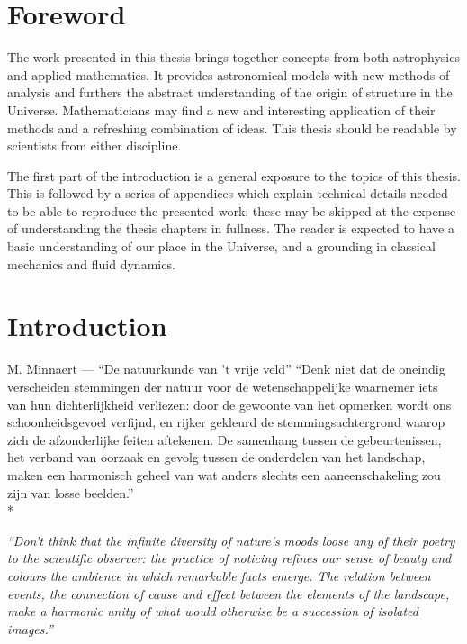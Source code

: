 
\chapter*{Foreword}
The work presented in this thesis brings together concepts from both astrophysics and applied mathematics. It provides astronomical models with new methods of analysis and furthers the abstract understanding of the origin of structure in the Universe. Mathematicians may find a new and interesting application of their methods and a refreshing combination of ideas. This thesis should be readable by scientists from either discipline.

The first part of the introduction is a general exposure to the topics of this thesis. This is followed by a series of appendices which explain technical details needed to be able to reproduce the presented work; these may be skipped at the expense of understanding the thesis chapters in fullness. The reader is expected to have a basic understanding of our place in the Universe, and a grounding in classical mechanics and fluid dynamics.

\chapter{Introduction}
\begin{aquote}{M. Minnaert --- ``De natuurkunde van \'{}t vrije veld''}
    ``Denk niet dat de oneindig verscheiden stemmingen der natuur voor de wetenschappelijke waarnemer iets van hun dichterlijkheid verliezen: door de gewoonte van het opmerken wordt ons schoonheidsgevoel verfijnd, en rijker gekleurd de stemmingsachtergrond waarop zich de afzonderlijke feiten aftekenen. De samenhang tussen de gebeurtenissen, het verband van oorzaak en gevolg tussen de onderdelen van het landschap, maken een harmonisch geheel van wat anders slechts een aaneenschakeling zou zijn van losse beelden.''
    \\*

    \textit{``Don't think that the infinite diversity of nature's moods loose any of their poetry to the scientific observer: the practice of noticing refines our sense of beauty and colours the ambience in which remarkable facts emerge.  The relation between events, the connection of cause and effect between the elements of the landscape, make a harmonic unity of what would otherwise be a succession of isolated images.''}
\end{aquote}

